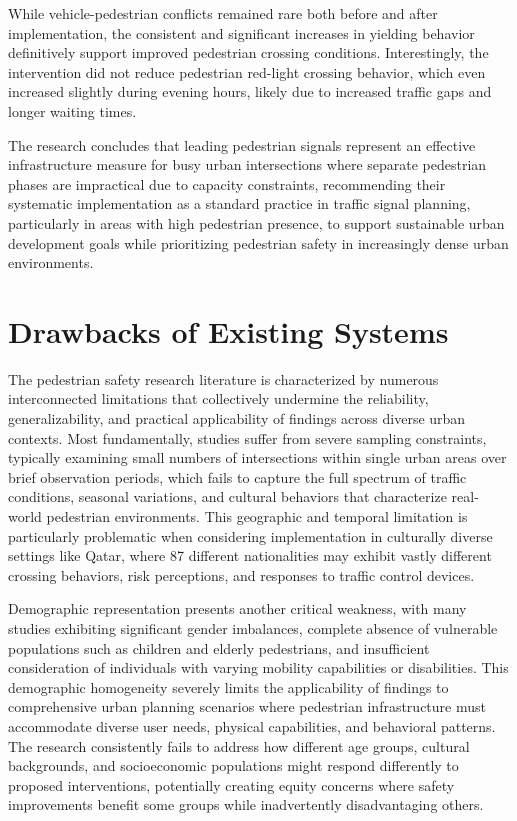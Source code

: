 \documentclass[a4paper, 12pt]{report}
\begin{document}
While vehicle-pedestrian conflicts remained rare both before and after implementation, the consistent and significant increases in yielding behavior definitively support improved pedestrian crossing conditions. Interestingly, the intervention did not reduce pedestrian red-light crossing behavior, which even increased slightly during evening hours, likely due to increased traffic gaps and longer waiting times.

The research concludes that leading pedestrian signals represent an effective infrastructure measure for busy urban intersections where separate pedestrian phases are impractical due to capacity constraints, recommending their systematic implementation as a standard practice in traffic signal planning, particularly in areas with high pedestrian presence, to support sustainable urban development goals while prioritizing pedestrian safety in increasingly dense urban environments.


\section{Drawbacks of Existing Systems}
The pedestrian safety research literature is characterized by numerous interconnected limitations that collectively undermine the reliability, generalizability, and practical applicability of findings across diverse urban contexts. Most fundamentally, studies suffer from severe sampling constraints, typically examining small numbers of intersections within single urban areas over brief observation periods, which fails to capture the full spectrum of traffic conditions, seasonal variations, and cultural behaviors that characterize real-world pedestrian environments. This geographic and temporal limitation is particularly problematic when considering implementation in culturally diverse settings like Qatar, where 87 different nationalities may exhibit vastly different crossing behaviors, risk perceptions, and responses to traffic control devices.

Demographic representation presents another critical weakness, with many studies exhibiting significant gender imbalances, complete absence of vulnerable populations such as children and elderly pedestrians, and insufficient consideration of individuals with varying mobility capabilities or disabilities. This demographic homogeneity severely limits the applicability of findings to comprehensive urban planning scenarios where pedestrian infrastructure must accommodate diverse user needs, physical capabilities, and behavioral patterns. The research consistently fails to address how different age groups, cultural backgrounds, and socioeconomic populations might respond differently to proposed interventions, potentially creating equity concerns where safety improvements benefit some groups while inadvertently disadvantaging others.
\end{document}
